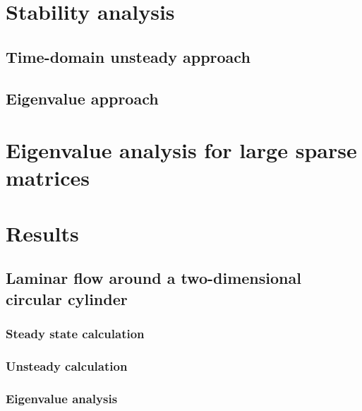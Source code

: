 \documentclass[journal,final]{new-aiaa}
\begin{document}
\section{Stability analysis}
\subsection{Time-domain unsteady approach}
\subsection{Eigenvalue approach}
\section{Eigenvalue analysis for large sparse matrices}

\section{Results}
\label{results}

\subsection{Laminar flow around a two-dimensional circular cylinder}

\subsubsection{Steady state calculation}
\subsubsection{Unsteady calculation}
\subsubsection{Eigenvalue analysis}

%
%
\end{document}
